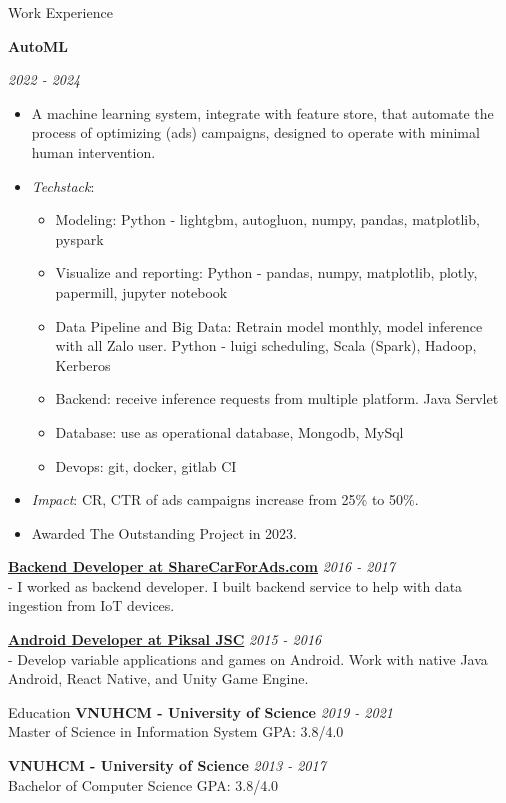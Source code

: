 \documentclass{resume} %
\begin{document}
\begin{rSection}{Work Experience}
{{{{{\textbf{AutoML} \hfill {\em \textit{2022 - 2024}
\begin{itemize}
    \item A machine learning system, integrate with feature store, that automate the process of optimizing (ads) campaigns, designed to operate with minimal human intervention.
    \item \textit{Techstack}:
    \begin{itemize}
        \item Modeling: Python - lightgbm, autogluon, numpy, pandas, matplotlib, pyspark
        \item Visualize and reporting: Python - pandas, numpy, matplotlib, plotly, papermill, jupyter notebook
        \item Data Pipeline and Big Data: Retrain model monthly,  model inference with all Zalo user. Python - luigi scheduling, Scala (Spark), Hadoop, Kerberos
        \item Backend: receive inference requests from multiple platform. Java Servlet
        \item Database: use as operational database, Mongodb, MySql
        \item Devops: git, docker, gitlab CI
    \end{itemize} 
    \item \textit{Impact}: CR, CTR of ads campaigns increase from 25\% to 50\%. 
    \item Awarded The Outstanding Project in 2023.
\end{itemize}

{\bf \underline{Backend Developer at ShareCarForAds.com}} \hfill {\em 2016 - 2017}\\
- I worked as backend developer. I built backend service to help with data ingestion from IoT devices. 

{\bf \underline{Android Developer at Piksal JSC}} \hfill {\em 2015 - 2016}\\
- Develop variable applications and games on Android. Work with native Java Android, React Native, and Unity Game Engine. 



\begin{rSection}{Education}
{\bf VNUHCM - University of Science} \hfill {\em 2019 - 2021 } 
\\ Master of Science in Information System  \hfill { GPA: 3.8/4.0 }

{\bf VNUHCM - University of Science} \hfill {\em 2013 - 2017 } 
\\ Bachelor of Computer Science  \hfill { GPA: 3.8/4.0 }



\end{rSection}}}}}}}
\end{rSection}
\end{document}

